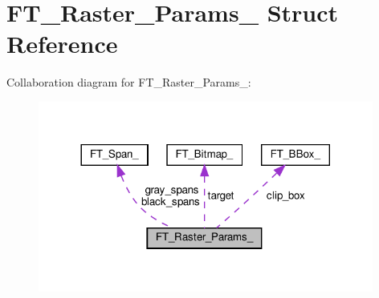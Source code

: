 \hypertarget{structFT__Raster__Params__}{}\section{F\+T\+\_\+\+Raster\+\_\+\+Params\+\_\+ Struct Reference}
\label{structFT__Raster__Params__}


Collaboration diagram for F\+T\+\_\+\+Raster\+\_\+\+Params\+\_\+\+:
\nopagebreak
\begin{figure}[H]
\begin{center}
\leavevmode
\includegraphics[width=312pt]{structFT__Raster__Params____coll__graph}
\end{center}
\end{figure}

